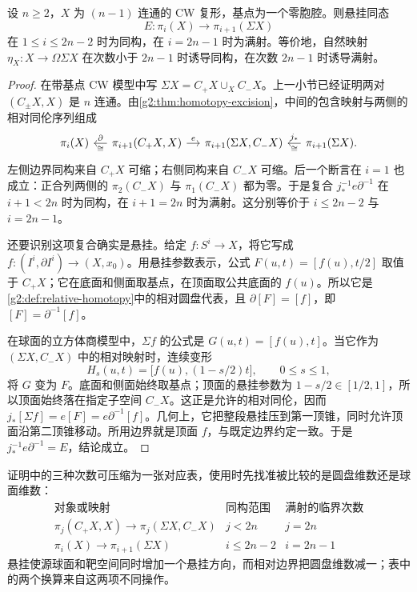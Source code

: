 \begin{theorem}\label{g2:thm:freudenthal}
	设 \(n\ge2\)，\(X\) 为 \((n-1)\) 连通的 CW 复形，基点为一个零胞腔。则悬挂同态
	\[
		E:\pi_i(X)\longrightarrow\pi_{i+1}(\Sigma X)
	\]
	在 \(1\le i\le2n-2\) 时为同构，在 \(i=2n-1\) 时为满射。等价地，自然映射 \(\eta_X:X\rightarrow\Omega\Sigma X\) 在次数小于 \(2n-1\) 时诱导同构，在次数 \(2n-1\) 时诱导满射。
\end{theorem}
\begin{proof}
	在带基点 CW 模型中写 \(\Sigma X=C_+X\cup_XC_-X\)。上一小节已经证明两对 \((C_\pm X,X)\) 是 \(n\) 连通。由\cref{g2:thm:homotopy-excision}，中间的包含映射与两侧的相对同伦序列组成
	\[
		\begin{tikzcd}[column sep=small]
			\pi_i(X) & \pi_{i+1}(C_+X,X) \arrow[l,"\partial"',"\cong"] \arrow[r,"e"] & \pi_{i+1}(\Sigma X,C_-X) & \pi_{i+1}(\Sigma X) \arrow[l,"j_*"',"\cong"] .
		\end{tikzcd}
	\]
	左侧边界同构来自 \(C_+X\) 可缩；右侧同构来自 \(C_-X\) 可缩。后一个断言在 \(i=1\) 也成立：正合列两侧的 \(\pi_2(C_-X)\) 与 \(\pi_1(C_-X)\) 都为零。于是复合 \(j_*^{-1}e\partial^{-1}\) 在 \(i+1<2n\) 时为同构，在 \(i+1=2n\) 时为满射。这分别等价于 \(i\le2n-2\) 与 \(i=2n-1\)。

	还要识别这项复合确实是悬挂。给定 \(f:S^i\rightarrow X\)，将它写成 \(f:(I^i,\partial I^i)\rightarrow(X,x_0)\)。用悬挂参数表示，公式 \(F(u,t)=[f(u),t/2]\) 取值于 \(C_+X\)；它在底面和侧面取基点，在顶面取公共底面的 \(f(u)\)。所以它是\cref{g2:def:relative-homotopy}中的相对圆盘代表，且 \(\partial[F]=[f]\)，即 \([F]=\partial^{-1}[f]\)。

	在球面的立方体商模型中，\(\Sigma f\) 的公式是 \(G(u,t)=[f(u),t]\)。当它作为 \((\Sigma X,C_-X)\) 中的相对映射时，连续变形
	\[
		H_s(u,t)=\bigl[f(u),(1-s/2)t\bigr],\qquad 0\le s\le1,
	\]
	将 \(G\) 变为 \(F\)。底面和侧面始终取基点；顶面的悬挂参数为 \(1-s/2\in[1/2,1]\)，所以顶面始终落在指定子空间 \(C_-X\)。这正是允许的相对同伦，因而 \(j_*[\Sigma f]=e[F]=e\partial^{-1}[f]\)。几何上，它把整段悬挂压到第一顶锥，同时允许顶面沿第二顶锥移动。所用边界就是顶面 \(f\)，与既定边界约定一致。于是 \(j_*^{-1}e\partial^{-1}=E\)，结论成立。
\end{proof}

证明中的三种次数可压缩为一张对应表，使用时先找准被比较的是圆盘维数还是球面维数：
\[
	\begin{array}{c|c|c}
		\text{对象或映射} & \text{同构范围} & \text{满射的临界次数}\\ \hline
		\pi_j(C_+X,X)\rightarrow\pi_j(\Sigma X,C_-X) & j<2n & j=2n\\
		\pi_i(X)\rightarrow\pi_{i+1}(\Sigma X) & i\le2n-2 & i=2n-1
	\end{array}
\]
悬挂使源球面和靶空间同时增加一个悬挂方向，而相对边界把圆盘维数减一；表中的两个换算来自这两项不同操作。


